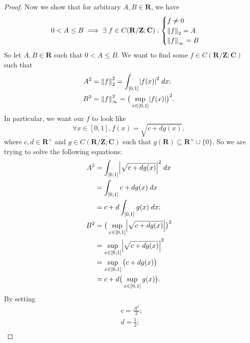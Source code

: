 \begin{proof}
    Now we show that for arbitrary \(A, B \in \mathbf{R}\), we have
    \[
        0 < A \leq B \implies \exists\ f \in C(\mathbf{R} / \mathbf{Z} ; \mathbf{C}) : \begin{cases}
            f \neq 0        \\
            \norm*{f}_2 = A \\
            \norm*{f}_{\infty} = B
        \end{cases}
    \]
    So let \(A, B \in \mathbf{R}\) such that \(0 < A \leq B\).
    We want to find some \(f \in C(\mathbf{R} / \mathbf{Z} ; \mathbf{C})\) such that
    \begin{align*}
        A^2 & = \norm*{f}_2^2 = \int_{[0, 1]} \abs*{f(x)}^2 \; dx;                  \\
        B^2 & = \norm*{f}_{\infty}^2 = \big(\sup_{x \in [0, 1]} \abs*{f(x)}\big)^2.
    \end{align*}
    In particular, we want our \(f\) to look like
    \[
        \forall x \in [0, 1], f(x) = \sqrt{c + d g(x)},
    \]
    where \(c, d \in \mathbf{R}^+\) and \(g \in C(\mathbf{R} / \mathbf{Z} ; \mathbf{C})\) such that \(g(\mathbf{R}) \subseteq \mathbf{R}^+ \cup \{0\}\).
    So we are trying to solve the following equations:
    \begin{align*}
        A^2 & = \int_{[0, 1]} \abs*{\sqrt{c + dg(x)}}^2 \; dx           \\
            & = \int_{[0, 1]} c + dg(x) \; dx                           \\
            & = c + d \int_{[0, 1]} g(x) \; dx;                         \\
        B^2 & = \big(\sup_{x \in [0, 1]} \abs*{\sqrt{c + dg(x)}}\big)^2 \\
            & = \sup_{x \in [0, 1]} \abs*{\sqrt{c + dg(x)}}^2           \\
            & = \sup_{x \in [0, 1]} \big(c + dg(x)\big)                 \\
            & = c + d \big(\sup_{x \in [0, 1]} g(x)\big).
    \end{align*}
    By setting
    \begin{align*}
         & c = \frac{A^2}{2};                                                                                                                                    \\
         & d = \frac{1}{2};                                                                                                                                      \\

\end{align*}
\end{proof}
